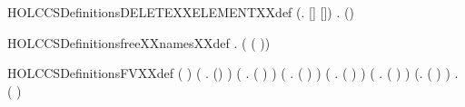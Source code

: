 \begin{SaveVerbatim}{HOLCCSDefinitionsDELETEXXELEMENTXXdef}
\HOLTokenTurnstile{} (\HOLSymConst{\HOLTokenForall{}}.   [] \HOLSymConst{=} []) \HOLSymConst{\HOLTokenConj{}}
   \HOLSymConst{\HOLTokenForall{}}  .
         (\HOLSymConst{::}) \HOLSymConst{=}
         \HOLSymConst{=}     
        \HOLSymConst{::}  
\end{SaveVerbatim}
\newcommand{\HOLCCSDefinitionsDELETEXXELEMENTXXdef}{\UseVerbatim{HOLCCSDefinitionsDELETEXXELEMENTXXdef}}
\begin{SaveVerbatim}{HOLCCSDefinitionsfreeXXnamesXXdef}
\HOLTokenTurnstile{} \HOLSymConst{\HOLTokenForall{}}.   \HOLSymConst{=}   ( ( ))
\end{SaveVerbatim}
\newcommand{\HOLCCSDefinitionsfreeXXnamesXXdef}{\UseVerbatim{HOLCCSDefinitionsfreeXXnamesXXdef}}
\begin{SaveVerbatim}{HOLCCSDefinitionsFVXXdef}
\HOLTokenTurnstile{} (  \HOLSymConst{=} \HOLTokenLeftbrace{}\HOLTokenRightbrace{}) \HOLSymConst{\HOLTokenConj{}} (\HOLSymConst{\HOLTokenForall{}} .  () \HOLSymConst{=}  ) \HOLSymConst{\HOLTokenConj{}}
   (\HOLSymConst{\HOLTokenForall{}} .  ( \HOLSymConst{+} ) \HOLSymConst{=}   \HOLConst{\HOLTokenUnion{}}  ) \HOLSymConst{\HOLTokenConj{}}
   (\HOLSymConst{\HOLTokenForall{}} .  ( \HOLSymConst{\ensuremath{\parallel}} ) \HOLSymConst{=}   \HOLConst{\HOLTokenUnion{}}  ) \HOLSymConst{\HOLTokenConj{}}
   (\HOLSymConst{\HOLTokenForall{}} .  (\HOLConst{\ensuremath{\nu}}  ) \HOLSymConst{=}  ) \HOLSymConst{\HOLTokenConj{}} (\HOLSymConst{\HOLTokenForall{}} .  (  ) \HOLSymConst{=}  ) \HOLSymConst{\HOLTokenConj{}}
   (\HOLSymConst{\HOLTokenForall{}}.  ( ) \HOLSymConst{=} \HOLTokenLeftbrace{}\HOLTokenRightbrace{}) \HOLSymConst{\HOLTokenConj{}} \HOLSymConst{\HOLTokenForall{}} .  (  ) \HOLSymConst{=}    \HOLTokenLeftbrace{}\HOLTokenRightbrace{}
\end{SaveVerbatim}
